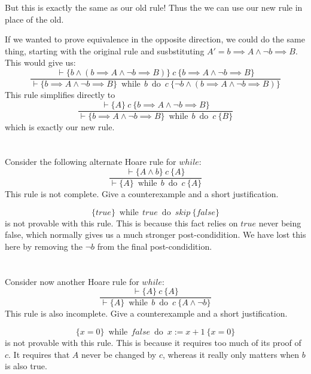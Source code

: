 \documentclass{article}
\newcommand{\problem}[1]
{\subsubsection*{} %
\vspace{-16pt} \section{} \vspace{-22pt} \qquad
#1%
\bigskip \bigskip
}
\newcommand{\while}[2]{\operatorname{while}\, #1\ \operatorname{do}\ #2}
\newcommand{\proves}{\vdash}
\newcommand{\axiomatic}[3]{\{#1\}\ #2\ \{#3\}}
\begin{document}
But this is exactly the same as our old rule! Thus the we can use our new rule
in place of the old.

\smallskip

If we wanted to prove equivalence in the opposite direction, we could do the
same thing, starting with the original rule and susbstituting $A' = b \implies
A \wedge \neg b \implies B$.  This would give us:
\[
\frac{\proves \axiomatic{b \wedge (b \implies A \wedge \neg b \implies B)}
  {c}{b \implies A \wedge \neg b \implies B}}
{\proves \axiomatic{b \implies A \wedge \neg b \implies B}{\while{b}{c}}
  {\neg b \wedge (b \implies A \wedge \neg b \implies B)}}
\]
This rule simplifies directly to 
\[
\frac{\proves \axiomatic{A}{c}{b \implies A \wedge \neg b \implies B}}
{\proves \axiomatic{b \implies A \wedge \neg b \implies B}{\while{b}{c}}{B}}
\]
which is exactly our new rule.

 \problem{Consider the following alternate Hoare rule for
$while$:
\[
\frac{\proves \axiomatic{A \wedge b}{c}{A}}
{\proves \axiomatic{A}{\while{b}{c}}{A}}
\]
This rule is not complete. Give a counterexample and a short justification.
}

\[\axiomatic{true}{\while{true}{skip}}{false}\] is not provable with this rule. 
This is because this fact relies on $true$ never being false, which normally
gives us a much stronger post-condidition.  We have lost this here by removing
the $\neg b$ from the final post-condidition.

\problem{Consider now another Hoare rule for $while$:
\[
\frac{\proves \axiomatic{A}{c}{A}}
{\proves \axiomatic{A}{\while{b}{c}}{A \wedge \neg b}}
\]
This rule is also incomplete. Give a counterexample and a short justification.
}

\[\axiomatic{x=0}{\while{false}{x:=x+1}}{x=0}\] is not provable with this rule.
This is because it requires too much of its proof of $c$.  It requires that 
$A$ never be changed by $c$, whereas it really only matters when $b$ is also
true.
\end{document}
